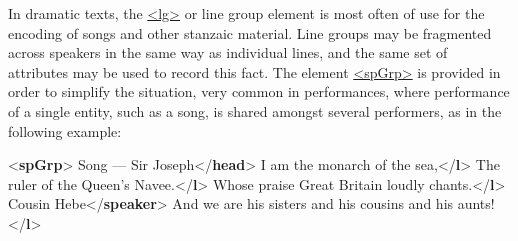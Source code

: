 In dramatic texts, the \hyperref[TEI.lg]{<lg>} or line group element is most often of use for the encoding of songs and other stanzaic material. Line groups may be fragmented across speakers in the same way as individual lines, and the same set of attributes may be used to record this fact. The element \hyperref[TEI.spGrp]{<spGrp>} is provided in order to simplify the situation, very common in performances, where performance of a single entity, such as a song, is shared amongst several performers, as in the following example: \par\bgroup{}\exampleFont \begin{shaded}\noindent\mbox{}{<\textbf{spGrp}>}\mbox{}\newline 
{}Song — Sir Joseph{</\textbf{head}>}\mbox{}\newline 
{}\mbox{}\newline 
\hspace*{1em}I am the monarch of the sea,{</\textbf{l}>}\mbox{}\newline 
\hspace*{1em}The ruler of the Queen's Navee.{</\textbf{l}>}\mbox{}\newline 
\hspace*{1em}Whose praise Great Britain loudly chants.{</\textbf{l}>}\mbox{}\newline 
{}\mbox{}\newline 
{}\mbox{}\newline 
\hspace*{1em}Cousin Hebe{</\textbf{speaker}>}\mbox{}\newline 
\hspace*{1em}And we are his sisters and his cousins and his aunts!{</\textbf{l}>}\mbox{}\newline 

\end{shaded}
